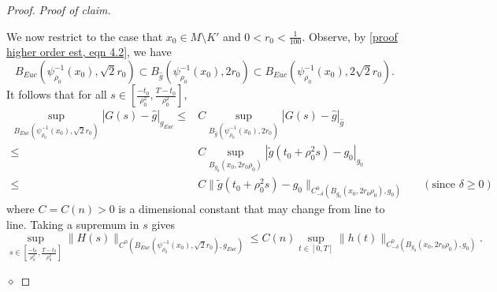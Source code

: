 \documentclass[12pt]{amsart}
\renewcommand{\1}{{\mathbf 1}}
\newenvironment{claimproof}{\par\noindent\textit{Proof of claim.}\space}{\hfill$\diamond$\medskip\par}
\theoremstyle{others}
\numberwithin{equation}{section}
\begin{document}
\begin{proof}
\begin{claimproof}
    
        We now restrict to the case that $x_0 \in M \setminus K'$ and $0 < r_0 < \frac1{100}$.
        Observe, by \eqref{proof higher order est, eqn 4.2}, we have
            $$B_{Euc} \left(\psi_{\rho_0}^{-1} (x_0) , \sqrt 2 r_0 \right) \subset 
            B_{\hat g } ( \psi_{\rho_0}^{-1} (x_0) , 2 r_0) \subset B_{Euc} ( \psi_{\rho_0}^{-1} (x_0), 2 \sqrt 2 r_0) .$$
        It follows that for all $s \in \left[ \frac{-t_0}{\rho_0^2} , \frac{T- t_0}{\rho_0^2} \right]$,
        \begin{align*}
             \sup_{B_{Euc}( \psi^{-1}_{\rho_0}(x_0) , \sqrt 2 r_0)} | G(s) - \hat g |_{g_{Euc}} 
             \le{}& C \sup_{ B_{\hat g} (\psi_{\rho_0}^{-1} (x_0) , 2r_0) }  | G(s) - \hat g |_{\hat g } \\
             \le{}& C\sup_{B_{g_0}( x_0, 2  r_0 \rho_0) } | \tilde g(t_0 + \rho_0^2 s) - g_0 |_{g_0} \\
             \le{}& C    \| \tilde g(t_0 + \rho_0^2 s) - g_0 \|_{C^0_{-\delta}( B_{g_0}(x_0, 2 r_0 \rho_0), g_0) }
             && (\text{since $\delta \ge 0$})
        \end{align*}
        where $C = C(n) > 0$ is a dimensional constant that may change from line to line.
        Taking a supremum in $s$ gives
        \begin{equation} \label{proof local higher order est, eqn 4}
            \sup_{s \in \left[ \frac{-t_0}{\rho_0^2} , \frac{T- t_0}{\rho_0^2} \right]}  \| H(s) \|_{C^0 ( B_{Euc}( \psi_{\rho_0}^{-1} (x_0), \sqrt 2 r_0) , g_{Euc}) } 
            \le C(n)   \sup_{t \in [0, T]} \| h(t) \|_{C^0_{-\delta}( B_{g_0}(x_0, 2 r_0 \rho_0), g_0) }.
        \end{equation}
        

\end{claimproof}
\end{proof}
\end{document}

